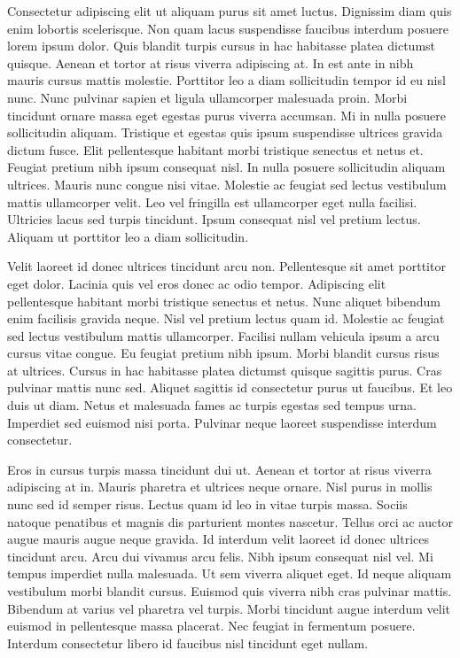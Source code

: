 \documentclass[11pt,a4paper]{article}
\begin{document}
Consectetur adipiscing elit ut aliquam purus sit amet luctus. Dignissim diam quis enim lobortis scelerisque. Non quam lacus suspendisse faucibus interdum posuere lorem ipsum dolor. Quis blandit turpis cursus in hac habitasse platea dictumst quisque. Aenean et tortor at risus viverra adipiscing at. In est ante in nibh mauris cursus mattis molestie. Porttitor leo a diam sollicitudin tempor id eu nisl nunc. Nunc pulvinar sapien et ligula ullamcorper malesuada proin. Morbi tincidunt ornare massa eget egestas purus viverra accumsan. Mi in nulla posuere sollicitudin aliquam. Tristique et egestas quis ipsum suspendisse ultrices gravida dictum fusce. Elit pellentesque habitant morbi tristique senectus et netus et. Feugiat pretium nibh ipsum consequat nisl. In nulla posuere sollicitudin aliquam ultrices. Mauris nunc congue nisi vitae. Molestie ac feugiat sed lectus vestibulum mattis ullamcorper velit. Leo vel fringilla est ullamcorper eget nulla facilisi. Ultricies lacus sed turpis tincidunt. Ipsum consequat nisl vel pretium lectus. Aliquam ut porttitor leo a diam sollicitudin.

Velit laoreet id donec ultrices tincidunt arcu non. Pellentesque sit amet porttitor eget dolor. Lacinia quis vel eros donec ac odio tempor. Adipiscing elit pellentesque habitant morbi tristique senectus et netus. Nunc aliquet bibendum enim facilisis gravida neque. Nisl vel pretium lectus quam id. Molestie ac feugiat sed lectus vestibulum mattis ullamcorper. Facilisi nullam vehicula ipsum a arcu cursus vitae congue. Eu feugiat pretium nibh ipsum. Morbi blandit cursus risus at ultrices. Cursus in hac habitasse platea dictumst quisque sagittis purus. Cras pulvinar mattis nunc sed. Aliquet sagittis id consectetur purus ut faucibus. Et leo duis ut diam. Netus et malesuada fames ac turpis egestas sed tempus urna. Imperdiet sed euismod nisi porta. Pulvinar neque laoreet suspendisse interdum consectetur.

Eros in cursus turpis massa tincidunt dui ut. Aenean et tortor at risus viverra adipiscing at in. Mauris pharetra et ultrices neque ornare. Nisl purus in mollis nunc sed id semper risus. Lectus quam id leo in vitae turpis massa. Sociis natoque penatibus et magnis dis parturient montes nascetur. Tellus orci ac auctor augue mauris augue neque gravida. Id interdum velit laoreet id donec ultrices tincidunt arcu. Arcu dui vivamus arcu felis. Nibh ipsum consequat nisl vel. Mi tempus imperdiet nulla malesuada. Ut sem viverra aliquet eget. Id neque aliquam vestibulum morbi blandit cursus. Euismod quis viverra nibh cras pulvinar mattis. Bibendum at varius vel pharetra vel turpis. Morbi tincidunt augue interdum velit euismod in pellentesque massa placerat. Nec feugiat in fermentum posuere. Interdum consectetur libero id faucibus nisl tincidunt eget nullam.
\end{document}
